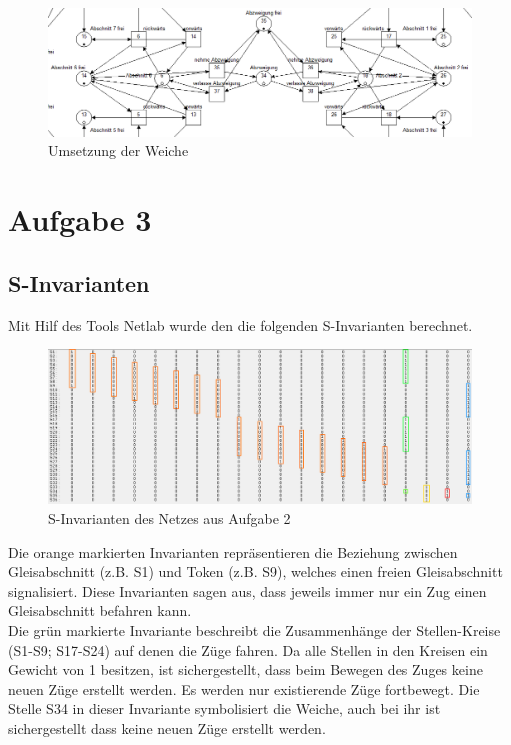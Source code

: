 \documentclass[10pt]{scrartcl}
\begin{document}
\begin{figure}[htbp]
	\centering	\includegraphics[width=1.0\textwidth]{Bilder/Aufgabe2_Weiche.png}
	\caption{Umsetzung der Weiche}
	\label{fig:Weiche}
\end{figure}

\section{Aufgabe 3}

\subsection{S-Invarianten}
Mit Hilf des Tools Netlab wurde den die folgenden S-Invarianten berechnet.

\begin{figure}[htbp]
	\centering	\includegraphics[width=1.0\textwidth]{Bilder/s_invarianten.png}
	\caption{S-Invarianten des Netzes aus Aufgabe 2}
	\label{fig:s_invarianten}
\end{figure}

Die orange markierten Invarianten repräsentieren die Beziehung zwischen Gleisabschnitt (z.B. S1) und Token (z.B. S9), welches einen freien Gleisabschnitt signalisiert.
Diese Invarianten sagen aus, dass jeweils immer nur ein Zug einen Gleisabschnitt befahren kann.\\

Die grün markierte Invariante beschreibt die Zusammenhänge der Stellen-Kreise (S1-S9; S17-S24) auf denen die Züge fahren.
Da alle Stellen in den Kreisen ein Gewicht von 1 besitzen, ist sichergestellt, dass beim Bewegen des Zuges keine neuen Züge erstellt werden. Es werden nur existierende Züge fortbewegt. Die Stelle S34 in dieser Invariante symbolisiert die Weiche, auch bei ihr ist sichergestellt dass keine neuen Züge erstellt werden.\\
  
\end{document}
